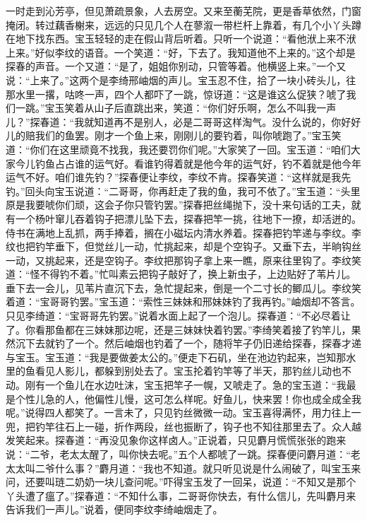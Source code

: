 \begin{parag}
    一时走到沁芳亭，但见萧疏景象，人去房空。又来至蘅芜院，更是香草依然，门窗掩闭。转过藕香榭来，远远的只见几个人在蓼溆一带栏杆上靠着，有几个小丫头蹲在地下找东西。宝玉轻轻的走在假山背后听着。只听一个说道：“看他洑上来不洑上来。”好似李纹的语音。一个笑道：“好，下去了。我知道他不上来的。”这个却是探春的声音。一个又道：“是了，姐姐你别动，只管等着。他横竖上来。”一个又说：“上来了。”这两个是李绮邢岫烟的声儿。宝玉忍不住，拾了一块小砖头儿，往那水里一撂，咕咚一声，四个人都吓了一跳，惊讶道：“这是谁这么促狭？唬了我们一跳。”宝玉笑着从山子后直跳出来，笑道：“你们好乐啊，怎么不叫我一声儿？”探春道：“我就知道再不是别人，必是二哥哥这样淘气。没什么说的，你好好儿的赔我们的鱼罢。刚才一个鱼上来，刚刚儿的要钓着，叫你唬跑了。”宝玉笑道：“你们在这里顽竟不找我，我还要罚你们呢。”大家笑了一回。宝玉道：“咱们大家今儿钓鱼占占谁的运气好。看谁钓得着就是他今年的运气好，钓不着就是他今年运气不好。咱们谁先钓？”探春便让李纹，李纹不肯。探春笑道：“这样就是我先钓。”回头向宝玉说道：“二哥哥，你再赶走了我的鱼，我可不依了。”宝玉道：“头里原是我要唬你们顽，这会子你只管钓罢。”探春把丝绳抛下，没十来句话的工夫，就有一个杨叶窜儿吞着钩子把漂儿坠下去，探春把竿一挑，往地下一撩，却活迸的。侍书在满地上乱抓，两手捧着，搁在小磁坛内清水养着。探春把钓竿递与李纹。李纹也把钓竿垂下，但觉丝儿一动，忙挑起来，却是个空钩子。又垂下去，半晌钩丝一动，又挑起来，还是空钩子。李纹把那钩子拿上来一瞧，原来往里钩了。李纹笑道：“怪不得钓不着。”忙叫素云把钩子敲好了，换上新虫子，上边贴好了苇片儿。垂下去一会儿，见苇片直沉下去，急忙提起来，倒是一个二寸长的鲫瓜儿。李纹笑着道：“宝哥哥钓罢。”宝玉道：“索性三妹妹和邢妹妹钓了我再钓。”岫烟却不答言。只见李绮道：“宝哥哥先钓罢。”说着水面上起了一个泡儿。探春道：“不必尽着让了。你看那鱼都在三妹妹那边呢，还是三妹妹快着钓罢。”李绮笑着接了钓竿儿，果然沉下去就钓了一个。然后岫烟也钓着了一个，随将竿子仍旧递给探春，探春才递与宝玉。宝玉道：“我是要做姜太公的。”便走下石矶，坐在池边钓起来，岂知那水里的鱼看见人影儿，都躲到别处去了。宝玉抡着钓竿等了半天，那钓丝儿动也不动。刚有一个鱼儿在水边吐沫，宝玉把竿子一幌，又唬走了。急的宝玉道：“我最是个性儿急的人，他偏性儿慢，这可怎么样呢。好鱼儿，快来罢！你也成全成全我呢。”说得四人都笑了。一言未了，只见钓丝微微一动。宝玉喜得满怀，用力往上一兜，把钓竿往石上一碰，折作两段，丝也振断了，钩子也不知往那里去了。众人越发笑起来。探春道：“再没见象你这样卤人。”正说着，只见麝月慌慌张张的跑来说：“二爷，老太太醒了，叫你快去呢。”五个人都唬了一跳。探春便问麝月道：“老太太叫二爷什么事？”麝月道：“我也不知道。就只听见说是什么闹破了，叫宝玉来问，还要叫琏二奶奶一块儿查问呢。”吓得宝玉发了一回呆，说道：“不知又是那个丫头遭了瘟了。”探春道：“不知什么事，二哥哥你快去，有什么信儿，先叫麝月来告诉我们一声儿。”说着，便同李纹李绮岫烟走了。
\end{parag}


